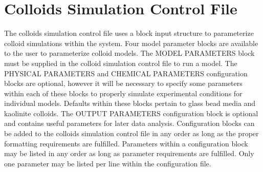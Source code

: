 \documentclass[letterpaper,10pt,english]{sphinxmanual}
\begin{document}
\section{Colloids Simulation Control File}
\label{\detokenize{index:colloids-simulation-control-file}}
The colloids simulation control file uses a block input structure to
parameterize colloid simulations within the  system. Four
model parameter blocks are available to the user to parameterize colloid
models. The MODEL PARAMETERS block must be supplied in the colloid
simulation control file to run a model. The PHYSICAL PARAMETERS and
CHEMICAL PARAMETERS configuration blocks are optional, however it will
be necessary to specify some parameters within each of these blocks to
properly simulate experimental conditions for individual models.
Defaults within these blocks pertain to glass bead media and kaolinite
colloids. The OUTPUT PARAMETERS configuration block is optional and
contains useful parameters for later data analysis. Configuration blocks
can be added to the colloids simulation control file in any order as
long as the proper formatting requirements are fulfilled. Parameters
within a configuration block may be listed in any order as long as
parameter requirements are fulfilled. Only one parameter may be listed
per line within the configuration file.
\end{document}
